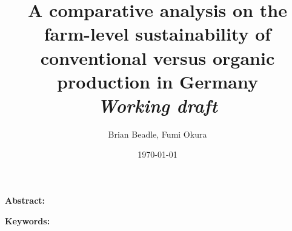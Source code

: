 \documentclass[a4paper,12pt]{article}
\title{A comparative analysis on the farm-level sustainability of conventional versus organic production in Germany \\ \vspace{1cm} \normalsize{\textit{Working draft}}}
\author{Brian Beadle, Fumi Okura}
\date{\today}
\begin{document}
\maketitle

\doublespacing

\textbf{Abstract:} 

\textbf{Keywords:} 

\newpage




 \newpage
 \newpage
\appendix 
\end{document}
